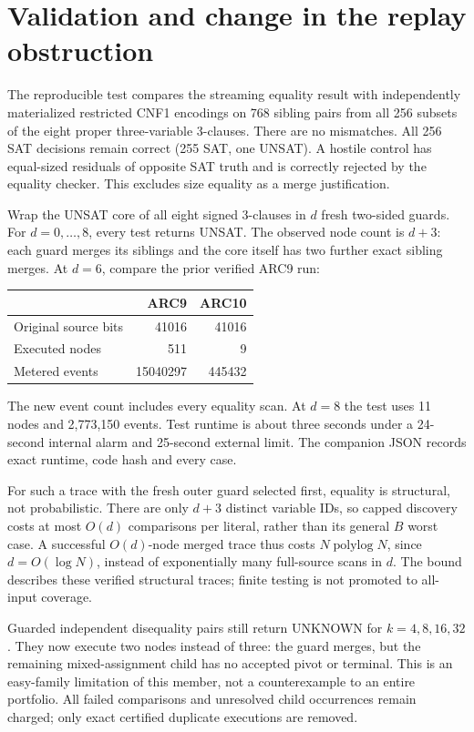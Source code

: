 \documentclass[11pt]{article}
\begin{document}
\section{Validation and change in the replay obstruction}
The reproducible test compares the streaming equality result with independently
materialized restricted CNF1 encodings on 768 sibling pairs from all 256
subsets of the eight proper three-variable 3-clauses. There are no mismatches.
All 256 SAT decisions remain correct (255 SAT, one UNSAT). A hostile control
has equal-sized residuals of opposite SAT truth and is correctly rejected by
the equality checker. This excludes size equality as a merge justification.

Wrap the UNSAT core of all eight signed 3-clauses in $d$ fresh two-sided guards.
For $d=0,\ldots,8$, every test returns UNSAT. The observed node count is $d+3$:
each guard merges its siblings and the core itself has two further exact
sibling merges. At $d=6$, compare the prior verified ARC9 run:
\begin{center}
\begin{tabular}{lrr}
\toprule
 & ARC9 & ARC10\\
\midrule
Original source bits & 41016 & 41016\\
Executed nodes & 511 & 9\\
Metered events & 15040297 & 445432\\
\bottomrule
\end{tabular}
\end{center}
The new event count includes every equality scan. At $d=8$ the test uses
11 nodes and 2,773,150 events. Test runtime is about three seconds under a
24-second internal alarm and 25-second external limit. The companion JSON
records exact runtime, code hash and every case.

For such a trace with the fresh outer guard selected first, equality is
structural, not probabilistic. There are only $d+3$ distinct variable IDs,
so capped discovery costs at most $O(d)$ comparisons per literal, rather
than its general $B$ worst case. A successful $O(d)$-node merged trace thus
costs $N\operatorname{polylog}N$, since $d=O(\log N)$, instead of exponentially
many full-source scans in $d$. The bound describes these verified structural
traces; finite testing is not promoted to all-input coverage.

Guarded independent disequality pairs still return UNKNOWN for
$k=4,8,16,32$. They now execute two nodes instead of three: the guard merges,
but the remaining mixed-assignment child has no accepted pivot or terminal.
This is an easy-family limitation of this member, not a counterexample to an
entire portfolio. All failed comparisons and unresolved child occurrences
remain charged; only exact certified duplicate executions are removed.
\end{document}
